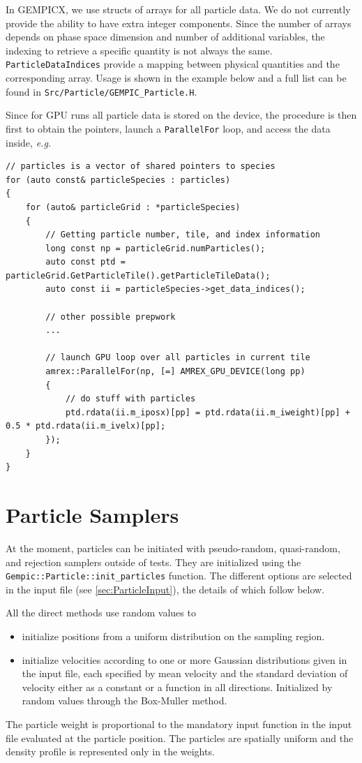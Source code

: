 \documentclass[11pt]{article}
\begin{document}
In GEMPICX, we use structs of arrays for all particle data. We do not currently provide the ability to have extra integer components.
Since the number of arrays depends on phase space dimension and number of additional variables, the indexing to retrieve a specific quantity is not always the same. \lstinline{ParticleDataIndices} provide a mapping between physical quantities and the corresponding array. Usage is shown in the example below and a full list can be found in \verb|Src/Particle/GEMPIC_Particle.H|.

Since for GPU runs all particle data is stored on the device, the procedure is then first to obtain the pointers, launch a \lstinline{ParallelFor} loop, and access the data inside, \emph{e.g.}
\begin{lstlisting}
// particles is a vector of shared pointers to species
for (auto const& particleSpecies : particles)
{
    for (auto& particleGrid : *particleSpecies)
    {
        // Getting particle number, tile, and index information
        long const np = particleGrid.numParticles();
        auto const ptd = particleGrid.GetParticleTile().getParticleTileData();
        auto const ii = particleSpecies->get_data_indices();

        // other possible prepwork
        ...

        // launch GPU loop over all particles in current tile
        amrex::ParallelFor(np, [=] AMREX_GPU_DEVICE(long pp)
        {
            // do stuff with particles
            ptd.rdata(ii.m_iposx)[pp] = ptd.rdata(ii.m_iweight)[pp] + 0.5 * ptd.rdata(ii.m_ivelx)[pp];
        });
    }
}
\end{lstlisting}


\section{Particle Samplers}
At the moment, particles can be initiated with pseudo-random, quasi-random, and rejection samplers outside of tests.
They are initialized using the \lstinline{Gempic::Particle::init_particles} function.
The different options are selected in the input file (see \ref{sec:ParticleInput}), the details of which follow below.

All the direct methods use random values to
\begin{itemize}
    \item initialize positions from a uniform distribution on the sampling region.
    \item initialize velocities according to one or more Gaussian distributions given in the input file, each specified by mean velocity and the standard deviation of velocity either as a constant or a function in all directions. Initialized by random values through the Box-Muller method.
\end{itemize}
The particle weight is proportional to the mandatory input function in the input file evaluated at the particle position. The particles are spatially uniform and the density profile is represented only in the weights.
\end{document}
